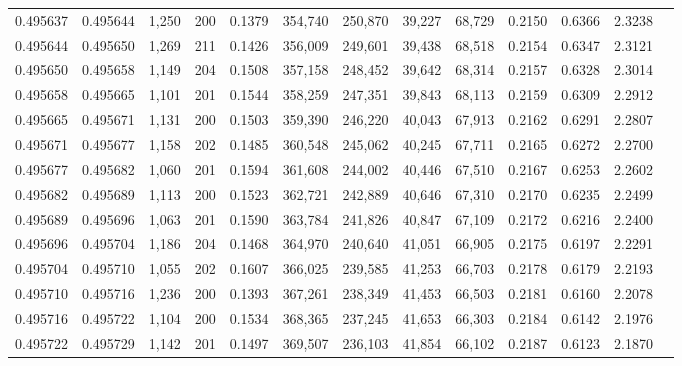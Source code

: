 \begin{tabular}{rrrrrrrrrrrrr}
0.495637 & 0.495644 & 1,250 & 200 &                                     0.1379 & 354,740 & 250,870 &  39,227 &  68,729 & 0.2150 & 0.6366 & 2.3238 \\
0.495644 & 0.495650 & 1,269 & 211 &                                     0.1426 & 356,009 & 249,601 &  39,438 &  68,518 & 0.2154 & 0.6347 & 2.3121 \\
0.495650 & 0.495658 & 1,149 & 204 &                                     0.1508 & 357,158 & 248,452 &  39,642 &  68,314 & 0.2157 & 0.6328 & 2.3014 \\
0.495658 & 0.495665 & 1,101 & 201 &                                     0.1544 & 358,259 & 247,351 &  39,843 &  68,113 & 0.2159 & 0.6309 & 2.2912 \\
0.495665 & 0.495671 & 1,131 & 200 &                                     0.1503 & 359,390 & 246,220 &  40,043 &  67,913 & 0.2162 & 0.6291 & 2.2807 \\
0.495671 & 0.495677 & 1,158 & 202 &                                     0.1485 & 360,548 & 245,062 &  40,245 &  67,711 & 0.2165 & 0.6272 & 2.2700 \\
0.495677 & 0.495682 & 1,060 & 201 &                                     0.1594 & 361,608 & 244,002 &  40,446 &  67,510 & 0.2167 & 0.6253 & 2.2602 \\
0.495682 & 0.495689 & 1,113 & 200 &                                     0.1523 & 362,721 & 242,889 &  40,646 &  67,310 & 0.2170 & 0.6235 & 2.2499 \\
0.495689 & 0.495696 & 1,063 & 201 &                                     0.1590 & 363,784 & 241,826 &  40,847 &  67,109 & 0.2172 & 0.6216 & 2.2400 \\
0.495696 & 0.495704 & 1,186 & 204 &                                     0.1468 & 364,970 & 240,640 &  41,051 &  66,905 & 0.2175 & 0.6197 & 2.2291 \\
0.495704 & 0.495710 & 1,055 & 202 &                                     0.1607 & 366,025 & 239,585 &  41,253 &  66,703 & 0.2178 & 0.6179 & 2.2193 \\
0.495710 & 0.495716 & 1,236 & 200 &                                     0.1393 & 367,261 & 238,349 &  41,453 &  66,503 & 0.2181 & 0.6160 & 2.2078 \\
0.495716 & 0.495722 & 1,104 & 200 &                                     0.1534 & 368,365 & 237,245 &  41,653 &  66,303 & 0.2184 & 0.6142 & 2.1976 \\
0.495722 & 0.495729 & 1,142 & 201 &                                     0.1497 & 369,507 & 236,103 &  41,854 &  66,102 & 0.2187 & 0.6123 & 2.1870 \\

\end{tabular}
